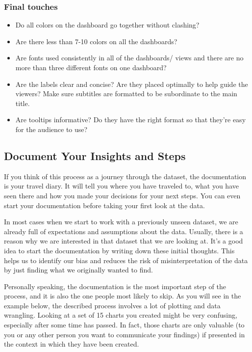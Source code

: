 \documentclass[]{book}
\providecommand{\tightlist}{%
  \setlength{\itemsep}{0pt}\setlength{\parskip}{0pt}}
\begin{document}
\hypertarget{final-touches}{%
\subsubsection{Final touches}\label{final-touches}}

\begin{itemize}
\tightlist
\item
  Do all colors on the dashboard go together without clashing?
\item
  Are there less than 7-10 colors on all the dashboards?
\item
  Are fonts used consistently in all of the dashboards/ views and there are no more than three different fonts on one dashboard?
\item
  Are the labels clear and concise? Are they placed optimally to help guide the viewers? Make sure subtitles are formatted to be subordinate to the main title.
\item
  Are tooltips informative? Do they have the right format so that they're easy for the audience to use?
\end{itemize}

\hypertarget{document-your-insights-and-steps}{%
\subsection{Document Your Insights and Steps}\label{document-your-insights-and-steps}}

If you think of this process as a journey through the dataset, the documentation is your travel diary. It will tell you where you have traveled to, what you have seen there and how you made your decisions for your next steps. You can even start your documentation before taking your first look at the data.

In most cases when we start to work with a previously unseen dataset, we are already full of expectations and assumptions about the data. Usually, there is a reason why we are interested in that dataset that we are looking at. It's a good idea to start the documentation by writing down these initial thoughts. This helps us to identify our bias and reduces the risk of misinterpretation of the data by just finding what we originally wanted to find.

Personally speaking, the documentation is the most important step of the process, and it is also the one people most likely to skip. As you will see in the example below, the described process involves a lot of plotting and data wrangling. Looking at a set of 15 charts you created might be very confusing, especially after some time has passed. In fact, those charts are only valuable (to you or any other person you want to communicate your findings) if presented in the context in which they have been created.
\end{document}
